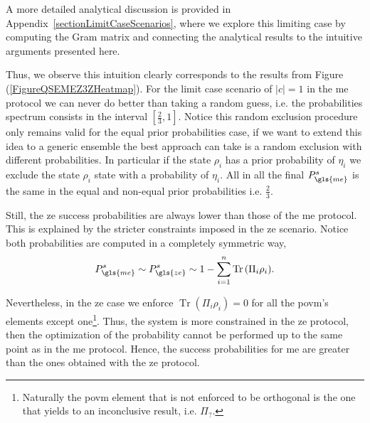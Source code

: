 \documentclass[12pt,letterpaper]{article}
\DeclareMathOperator{\tr}{Tr}
\begin{document}
A more detailed analytical discussion is provided in Appendix~\ref{sectionLimitCaseScenarios}, where we explore this limiting case by computing the Gram matrix and connecting the analytical results to the intuitive arguments presented here. 

Thus, we observe this intuition clearly corresponds to the results from Figure (\ref{FigureQSEMEZ3ZHeatmap}). For the limit case scenario of $|c|=1$ in the \gls{me} protocol we can never do better than taking a random guess, i.e. the probabilities spectrum consists in the interval $[\frac{2}{3},1]$. Notice this random exclusion procedure only remains valid for the equal prior probabilities case, if we want to extend this idea to a generic ensemble the best approach can take is a random exclusion with different probabilities. In particular if the state $\rho_i$ has a prior probability of $\eta_i$ we exclude the state $\rho_i$ state with a probability of $\eta_i$. All in all the final $P_{\gls{me}}^s$ is the same in the equal and non-equal prior probabilities i.e. $\frac{2}{3}$.

Still, the \gls{ze} success probabilities are always lower than those of the \gls{me} protocol. This is explained by the stricter constraints imposed in the \gls{ze} scenario. Notice both probabilities are computed in a completely symmetric way,
\begin{align*}
	P^s_{\gls{me}}\sim P^s_{\gls{ze}}\sim 1-\sum_{i=1}^n\tr{(\Pi_i\rho_i)}.
\end{align*}

Nevertheless, in the \gls{ze} case we enforce $\tr{(\Pi_i\rho_i)}=0$ for all the \gls{povm}'s elements except one\footnote{Naturally the \gls{povm} element that is not enforced to be orthogonal is the one that yields to an inconclusive result, i.e. $\Pi_?$.}. Thus, the system is more constrained in the \gls{ze} protocol, then the optimization of the probability cannot be performed up to the same point as in the \gls{me} protocol. Hence, the success probabilities for \gls{me} are greater than the ones obtained with the \gls{ze} protocol.
\end{document}
